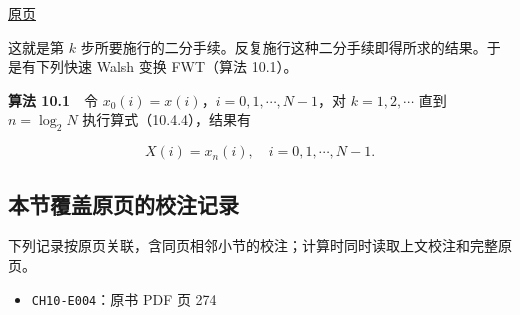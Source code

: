 \documentclass[
  10pt,
  fontset=fandol]{ctexart}
\providecommand{\tightlist}{%
  \setlength{\itemsep}{0pt}\setlength{\parskip}{0pt}}
\begin{document}
\href{../../source-images/pdf-275.jpeg}{原页}

这就是第 \(k\) 步所要施行的二分手续。反复施行这种二分手续即得所求的结果。于是有下列快速 Walsh 变换 FWT（算法 10.1）。

\textbf{算法 10.1}　令 \(x_0(i)=x(i)\)，\(i=0,1,\cdots,N-1\)，对 \(k=1,2,\cdots\) 直到 \(n=\log_2N\) 执行算式（10.4.4），结果有

\[
X(i)=x_n(i),\quad i=0,1,\cdots,N-1.
\]

\subsection{本节覆盖原页的校注记录}\label{ux672cux8282ux8986ux76d6ux539fux9875ux7684ux6821ux6ce8ux8bb0ux5f55}

下列记录按原页关联，含同页相邻小节的校注；计算时同时读取上文校注和完整原页。

\begin{itemize}
\tightlist
\item
  \texttt{CH10-E004}：原书 PDF 页 274
\end{itemize}
\end{document}

